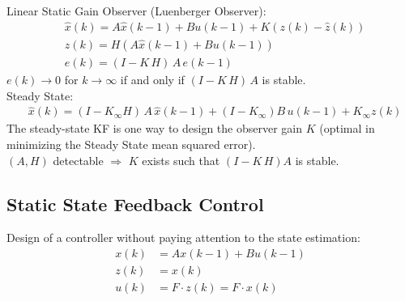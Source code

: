 \documentclass[landscape,a4paper,8pt]{scrartcl}
\begin{document}
\begin{multicols*}{3}
Linear Static Gain Observer (Luenberger Observer):
\begin{align*}
&\hat{x}(k) = A \hat{x}(k-1) + B u (k-1) + K(z(k) - \hat{z}(k)) \\
&\hat{z}(k) = H ( A \hat{x}(k-1) + B u(k-1)) \\
&e(k)= (I-K \, H)\, A \,  e(k-1)
\end{align*}
$e(k) \to 0$ for $k \to \infty$ if and only if $(I-K \, H)\, A$ is stable.\\

Steady State: 
\begin{align*}
&\hat{x}(k) = (I-K_\infty H )\, A\, \hat{x}(k-1) + (I-K_\infty) B \, u(k-1) + K_\infty z(k)
\end{align*}
The steady-state KF is one way to design the observer gain $K$ (optimal in minimizing the Steady State mean squared error). \\




%
%

$(A,H)$ detectable $ \Rightarrow$ $K$ exists such that $(I-K \, H) A$ is stable.

\subsection{Static State Feedback Control}
Design of a controller without paying attention to the state estimation:
\begin{align*}
x(k) &= A x(k-1) + B u(k-1) \tag{Process without noise} \\
z(k) &= x(k)  \tag{Perfect State information} \\
u(k) &= F \cdot z(k) = F \cdot x(k) \tag{Control Law}
\end{align*}


\end{multicols*}
\end{document}
